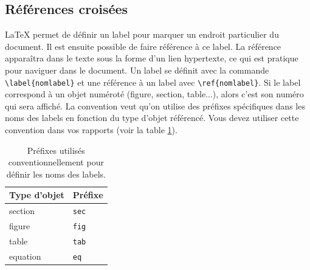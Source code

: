 \documentclass{ceri}
\begin{document}
\subsection{Références croisées}
\label{sec:references}
\LaTeX{} permet de définir un label pour marquer un endroit particulier du document. Il est ensuite possible de faire référence à ce label. La référence apparaîtra dans le texte sous la forme d'un lien hypertexte, ce qui est pratique pour naviguer dans le document. 
Un label se définit avec la commande \texttt{\textbackslash{}label\{nomlabel\}} et une référence à un label avec \texttt{\textbackslash{}ref\{nomlabel\}}. Si le label correspond à un objet numéroté (figure, section, table...), alors c'est son numéro qui sera affiché.
La convention veut qu'on utilise des préfixes spécifiques dans les noms des labels en fonction du type d'objet référencé. Vous devez utiliser cette convention dans vos rapports (voir la table \ref{tab:prefixes}).
\begin{table}[htb]
	\centering
	\begin{tabular}{l l}
		\hline
		\rowcolor{DarkColor} 
		\textbf{Type d'objet}	& \textbf{Préfixe}	\\
		\hline
		section					& \texttt{sec}	\\
		figure 					& \texttt{fig}	\\
		table 					& \texttt{tab}	\\
		equation 				& \texttt{eq}	\\
		\hline
	\end{tabular}
	\caption{Préfixes utilisés conventionnellement pour définir les noms des labels.}
	\label{tab:prefixes}
\end{table}
\end{document}
